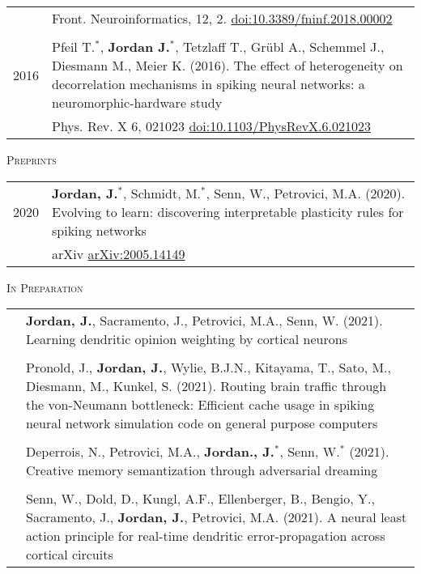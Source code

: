 \begin{longtable}{>{\hfill}p{1.6cm} p{}}
       & \footnotesize Front. Neuroinformatics, 12, 2. \href{https://doi.org/10.3389/fninf.2018.00002}{doi:10.3389/fninf.2018.00002} \\
  \multicolumn{2}{c}{} \\
  2016 & Pfeil T.$^*$, \textbf{Jordan J.}$^*$, Tetzlaff T., Gr\"ubl A., Schemmel J., Diesmann M., Meier K. (2016). The effect of heterogeneity on decorrelation mechanisms in spiking neural networks: a neuromorphic-hardware study \\
       & \footnotesize Phys. Rev. X 6, 021023 \href{http://dx.doi.org/10.1103/PhysRevX.6.021023}{doi:10.1103/PhysRevX.6.021023} \\
\end{longtable}

\textsc{Preprints}
\begin{longtable}{>{\hfill}p{1.6cm} p{}}
  2020 & \textbf{Jordan, J.}$^*$, Schmidt, M.$^*$, Senn, W., Petrovici, M.A. (2020). Evolving to learn: discovering interpretable plasticity rules for spiking networks \\
       & \footnotesize arXiv \href{https://arxiv.org/abs/2005.14149}{arXiv:2005.14149} \\
\end{longtable}

\newpage

\textsc{In Preparation}
\begin{longtable}{>{\hfill}p{1.6cm} p{}}
  & \textbf{Jordan, J.}, Sacramento, J., Petrovici, M.A., Senn, W. (2021). Learning dendritic opinion weighting by cortical neurons \\
  \multicolumn{2}{c}{} \\
  & Pronold, J., \textbf{Jordan, J.}, Wylie, B.J.N., Kitayama, T., Sato, M., Diesmann, M., Kunkel, S. (2021). Routing brain traffic through the von-Neumann bottleneck: Efficient cache usage in spiking neural network simulation code on general purpose computers \\
  \multicolumn{2}{c}{} \\
  & Deperrois, N., Petrovici, M.A., \textbf{Jordan., J.}$^*$, Senn, W.$^*$ (2021). Creative memory semantization through adversarial dreaming \\
  \multicolumn{2}{c}{} \\
  & Senn, W., Dold, D., Kungl, A.F., Ellenberger, B., Bengio, Y., Sacramento, J., \textbf{Jordan, J.}, Petrovici, M.A. (2021). A neural least action principle for real-time dendritic error-propagation across cortical circuits
\end{longtable}

